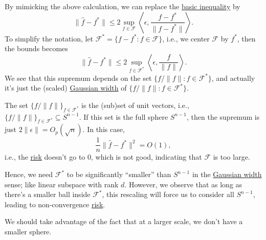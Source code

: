 By mimicking the above calculation, we can replace the \hyperref[eq:basic-inequality]{basic inequality} by
\[
	\lVert \hat{f} - f^{\ast} \rVert \leq 2 \sup _{f\in \mathscr{F} } \left\langle \epsilon , \frac{f - f^{\ast} }{\lVert f - f^{\ast} \rVert } \right\rangle .
\]
To simplify the notation, let \(\mathscr{F} ^{\ast} = \{ f - f^{\ast} \colon f \in \mathscr{F} \} \), i.e., we center \(\mathscr{F} \) by \(f^{\ast} \), then the bounds becomes
\[
	\lVert \hat{f} - f^{\ast} \rVert \leq 2 \sup _{f\in \mathscr{F} ^{\ast} } \left\langle \epsilon , \frac{f}{\lVert f \rVert } \right\rangle .
\]
We see that this supremum depends on the set \(\{ f / \lVert f \rVert \colon f\in \mathscr{F} ^{\ast} \} \), and actually it's just the (scaled) \hyperref[def:Gaussian-width]{Gaussian width} of \(\{ f / \lVert f \rVert \colon f\in \mathscr{F} ^{\ast} \}\).

\begin{note}
	The set \(\{ f / \lVert f \rVert \} _{f\in \mathscr{F} ^{\ast} }\) is the (sub)set of unit vectors, i.e., \(\{ f / \lVert f \rVert \} _{f\in \mathscr{F} ^{\ast} } \subseteq S^{n-1}\). If this set is the full sphere \(S^{n-1}\), then the supremum is just \(2 \lVert \epsilon \rVert = O_p (\sqrt{n} )\). In this case,
	\[
		\frac{1}{n} \lVert \hat{f} - f^{\ast}  \rVert ^2 = O(1),
	\]
	i.e., the \hyperref[not:risk]{risk} doesn't go to \(0\), which is not good, indicating that \(\mathscr{F} \) is too large.
\end{note}

Hence, we need \(\mathscr{F} ^{\ast} \) to be significantly ``smaller'' than \(S^{n-1}\) in the \hyperref[def:Gaussian-width]{Gaussian width} sense; like linear subspace with rank \(d\). However, we observe that as long as there's a smaller ball inside \(\mathscr{F} ^{\ast} \), this rescaling will force us to consider all \(S^{n-1}\), leading to non-convergence \hyperref[not:risk]{risk}.

\begin{center}
\end{center}

\begin{intuition}
	We should take advantage of the fact that at a larger scale, we don't have a smaller sphere.
\end{intuition}

